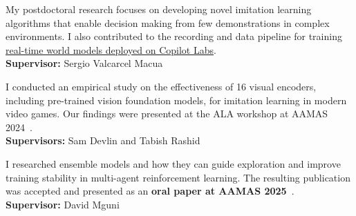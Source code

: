 \documentclass[a4paper,12pt]{article}
\begin{document}
\begin{expblock}
    My postdoctoral research focuses on developing novel imitation learning algorithms that enable decision making from few demonstrations in complex environments. I also contributed to the recording and data pipeline for training \href{https://copilot.microsoft.com/labs/experiments/copilot-gaming-experiences}{real-time world models deployed on Copilot Labs}.\\
    \textbf{Supervisor:} Sergio Valcarcel Macua
\end{expblock}

\begin{expblock}
    I conducted an empirical study on the effectiveness of 16 visual encoders, including pre-trained vision foundation models, for imitation learning in modern video games. Our findings were presented at the ALA workshop at AAMAS 2024~\cite{schaefer2025visual}.\\
    \textbf{Supervisors:} Sam Devlin and Tabish Rashid
\end{expblock}

\begin{expblock}
    I researched ensemble models and how they can guide exploration and improve training stability in multi-agent reinforcement learning. The resulting publication was accepted and presented as an \textbf{oral paper at AAMAS 2025}~\cite{schaefer2025emax}.\\
    \textbf{Supervisor:} David Mguni
\end{expblock}
\end{document}
